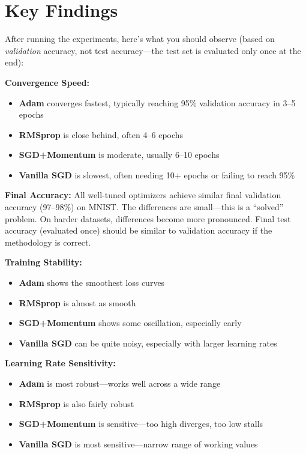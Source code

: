 \documentclass[../../main.tex]{subfiles}
\begin{document}
\section{Key Findings}
\label{sec:capstone-findings}

After running the experiments, here's what you should observe (based on \textit{validation} accuracy, not test accuracy---the test set is evaluated only once at the end):

\begin{keyconcept}
\textbf{Convergence Speed:}
\begin{itemize}
    \item \textbf{Adam} converges fastest, typically reaching 95\% validation accuracy in 3--5 epochs
    \item \textbf{RMSprop} is close behind, often 4--6 epochs
    \item \textbf{SGD+Momentum} is moderate, usually 6--10 epochs
    \item \textbf{Vanilla SGD} is slowest, often needing 10+ epochs or failing to reach 95\%
\end{itemize}
\end{keyconcept}

\begin{keyconcept}
\textbf{Final Accuracy:}
All well-tuned optimizers achieve similar final validation accuracy (97--98\%) on MNIST. The differences are small---this is a ``solved'' problem. On harder datasets, differences become more pronounced. Final test accuracy (evaluated once) should be similar to validation accuracy if the methodology is correct.
\end{keyconcept}

\begin{keyconcept}
\textbf{Training Stability:}
\begin{itemize}
    \item \textbf{Adam} shows the smoothest loss curves
    \item \textbf{RMSprop} is almost as smooth
    \item \textbf{SGD+Momentum} shows some oscillation, especially early
    \item \textbf{Vanilla SGD} can be quite noisy, especially with larger learning rates
\end{itemize}
\end{keyconcept}

\begin{keyconcept}
\textbf{Learning Rate Sensitivity:}
\begin{itemize}
    \item \textbf{Adam} is most robust---works well across a wide range
    \item \textbf{RMSprop} is also fairly robust
    \item \textbf{SGD+Momentum} is sensitive---too high diverges, too low stalls
    \item \textbf{Vanilla SGD} is most sensitive---narrow range of working values
\end{itemize}
\end{keyconcept}
\end{document}
